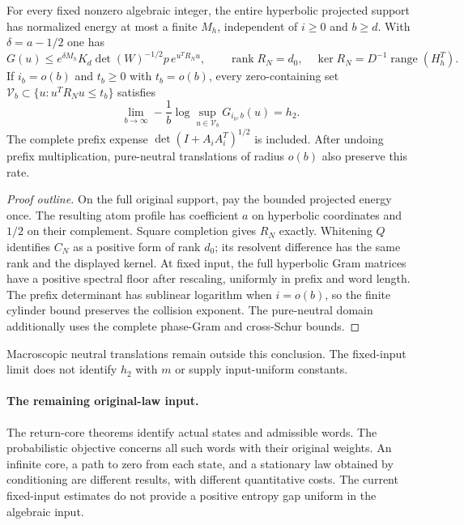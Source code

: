 \begin{theorem}\label{ret:neutral-localization}
For every fixed nonzero algebraic integer, the entire hyperbolic projected support has normalized energy at most a finite $M_h$, independent of $i\ge0$ and $b\ge d$.
With $\delta=a-1/2$ one has
\[
 G(u)\le e^{\delta M_h}K_d\det(W)^{-1/2}p\,e^{u^TR_Nu},
 \qquad \operatorname{rank}R_N=d_0,\quad
 \ker R_N=D^{-1}\operatorname{range}(H_h^T).
\]
If $i_b=o(b)$ and $t_b\ge0$ with $t_b=o(b)$, every zero-containing set $\mathcal V_b\subset\{u:u^TR_Nu\le t_b\}$ satisfies
\[
 \lim_{b\to\infty}-\frac1b\log\sup_{u\in\mathcal V_b}G_{i_b,b}(u)=h_2.
\]
The complete prefix expense $\det(I+A_iA_i^T)^{1/2}$ is included.
After undoing prefix multiplication, pure-neutral translations of radius $o(b)$ also preserve this rate.
\end{theorem}
\begin{proof}[Proof outline]
On the full original support, pay the bounded projected energy once.
The resulting atom profile has coefficient $a$ on hyperbolic coordinates and $1/2$ on their complement.
Square completion gives $R_N$ exactly.
Whitening $Q$ identifies $C_N$ as a positive form of rank $d_0$; its resolvent difference has the same rank and the displayed kernel.
At fixed input, the full hyperbolic Gram matrices have a positive spectral floor after rescaling, uniformly in prefix and word length.
The prefix determinant has sublinear logarithm when $i=o(b)$, so the finite cylinder bound preserves the collision exponent.
The pure-neutral domain additionally uses the complete phase-Gram and cross-Schur bounds.
\end{proof}
Macroscopic neutral translations remain outside this conclusion.
The fixed-input limit does not identify $h_2$ with $m$ or supply input-uniform constants.


\paragraph{The remaining original-law input.}
The return-core theorems identify actual states and admissible words.
The probabilistic objective concerns all such words with their original weights.
An infinite core, a path to zero from each state, and a stationary law obtained by conditioning are different results, with different quantitative costs.
The current fixed-input estimates do not provide a positive entropy gap uniform in the algebraic input.

